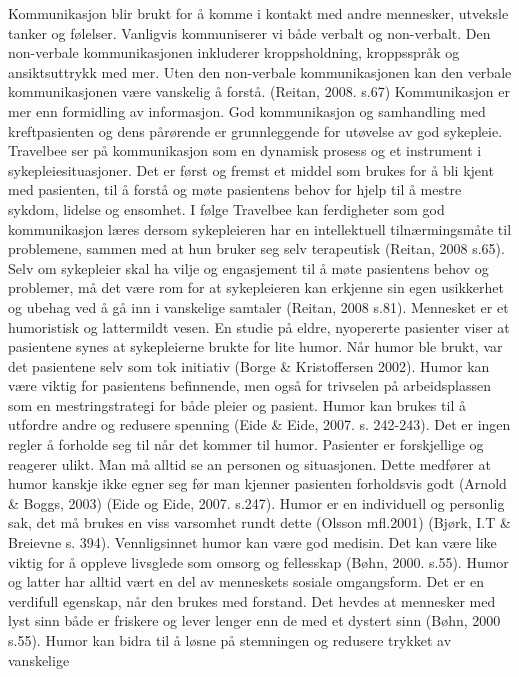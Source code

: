 Kommunikasjon blir brukt for å komme i kontakt med andre mennesker, utveksle
tanker og følelser. Vanligvis kommuniserer vi både verbalt og non-verbalt. Den
non-verbale kommunikasjonen inkluderer kroppsholdning, kroppsspråk og
ansiktsuttrykk med mer. Uten den non-verbale kommunikasjonen kan den verbale
kommunikasjonen være vanskelig å forstå. (Reitan, 2008. s.67) Kommunikasjon er
mer enn formidling av informasjon. God kommunikasjon og samhandling med
kreftpasienten og dens pårørende er grunnleggende for utøvelse av god
sykepleie. Travelbee ser på kommunikasjon som en dynamisk prosess og et
instrument i sykepleiesituasjoner. Det er først og fremst et middel som brukes
for å bli kjent med pasienten, til å forstå og møte pasientens behov for hjelp
til å mestre sykdom, lidelse og ensomhet. I følge Travelbee kan ferdigheter som
god kommunikasjon læres dersom sykepleieren har en intellektuell
tilnærmingsmåte til problemene, sammen med at hun bruker seg selv terapeutisk
(Reitan, 2008 s.65). Selv om sykepleier skal ha vilje og engasjement til å møte
pasientens behov og problemer, må det være rom for at sykepleieren kan erkjenne
sin egen usikkerhet og ubehag ved å gå inn i vanskelige samtaler (Reitan, 2008
s.81).  Mennesket er et humoristisk og lattermildt vesen. En studie på eldre,
nyopererte pasienter viser at pasientene synes at sykepleierne brukte for lite
humor. Når humor ble brukt, var det pasientene selv som tok initiativ (Borge
\&{}
Kristoffersen 2002). Humor kan være viktig for pasientens befinnende, men også
for trivselen på arbeidsplassen som en mestringstrategi for både pleier og
pasient. Humor kan brukes til å utfordre andre og redusere spenning (Eide \&{}
Eide, 2007. s. 242-243).  Det er ingen regler å forholde seg til når det kommer
til humor. Pasienter er forskjellige og reagerer ulikt. Man må alltid se an
personen og situasjonen. Dette medfører at humor kanskje ikke egner seg før man
kjenner pasienten forholdsvis godt (Arnold \&{} Boggs, 2003) (Eide og Eide, 2007.
s.247). Humor er en individuell og personlig sak, det må brukes en viss
varsomhet rundt dette (Olsson mfl.2001) (Bjørk, I.T \&{} Breievne s. 394).
Vennligsinnet humor kan være god medisin. Det kan være like viktig for å
oppleve livsglede som omsorg og fellesskap (Bøhn, 2000. s.55). Humor og latter
har alltid vært en del av menneskets sosiale omgangsform. Det er en verdifull
egenskap, når den brukes med forstand. Det hevdes at mennesker med lyst sinn
både er friskere og lever lenger enn de med et dystert sinn (Bøhn, 2000 s.55).
Humor kan bidra til å løsne på stemningen og redusere trykket av vanskelige
